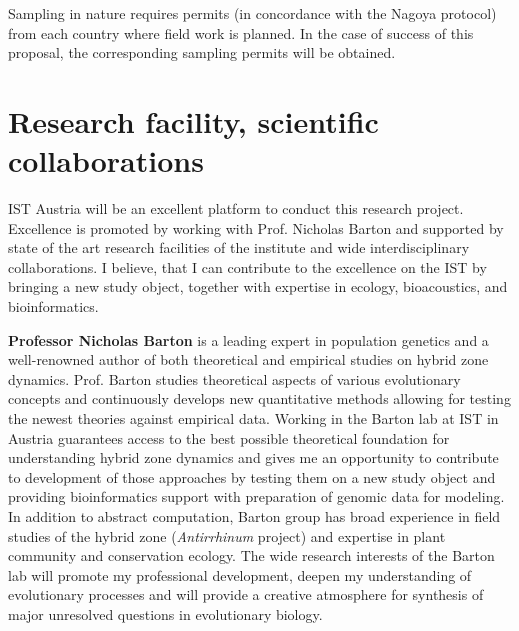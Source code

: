 \documentclass[11pt,a4paper]{article}
\begin{document}
Sampling in nature requires permits (in concordance with the Nagoya protocol) from each country where field work is planned. In the case of success of this proposal, the corresponding sampling permits will be obtained.


\section{Research facility, scientific collaborations}

IST Austria will be an excellent platform to conduct this research project. Excellence is promoted by working with Prof. Nicholas Barton and supported by state of the art research facilities of the institute and wide interdisciplinary collaborations. I believe, that I can contribute to the excellence on the IST by bringing a new study object, together with expertise in ecology, bioacoustics, and bioinformatics.

{\bf Professor Nicholas Barton} is a leading expert in population genetics and a well-renowned author of both theoretical and empirical studies on hybrid zone dynamics. Prof. Barton studies theoretical aspects of various evolutionary concepts and continuously develops new quantitative methods allowing for testing the newest theories against empirical data. Working in the Barton lab at IST in Austria guarantees access to the best possible theoretical foundation for understanding hybrid zone dynamics and gives me an opportunity to contribute to development of those approaches by testing them on a new study object and providing bioinformatics support with preparation of genomic data for modeling. In addition to abstract computation, Barton group has broad experience in field studies of the hybrid zone (\textit{Antirrhinum} project) and expertise in plant community and conservation ecology. The wide research interests of the Barton lab will promote my professional development, deepen my understanding of evolutionary processes and will provide a creative atmosphere for synthesis of major unresolved questions in evolutionary biology.
\end{document}
